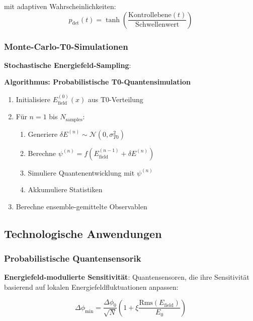\documentclass[12pt,a4paper]{article}
\newcommand{\xipar}{\xi}
\theoremstyle{definition}
\theoremstyle{remark}
\begin{document}
mit adaptiven Wahrscheinlichkeiten:
\begin{equation}
	p_{\text{det}}(t) = \tanh\left(\frac{\text{Kontrollebene}(t)}{\text{Schwellenwert}}\right)
	\label{eq:adaptive_probabilities}
\end{equation}

\subsubsection{Monte-Carlo-T0-Simulationen}

\textbf{Stochastische Energiefeld-Sampling}:

\textbf{Algorithmus: Probabilistische T0-Quantensimulation}
\begin{enumerate}
	\item Initialisiere $E_{\text{field}}^{(0)}(x)$ aus T0-Verteilung
	\item Für $n = 1$ bis $N_{\text{samples}}$:
	\begin{enumerate}
		\item Generiere $\delta E^{(n)} \sim \mathcal{N}(0, \sigma_{T0}^2)$
		\item Berechne $\psi^{(n)} = f(E_{\text{field}}^{(n-1)} + \delta E^{(n)})$
		\item Simuliere Quantenentwicklung mit $\psi^{(n)}$
		\item Akkumuliere Statistiken
	\end{enumerate}
	\item Berechne ensemble-gemittelte Observablen
\end{enumerate}

\subsection{Technologische Anwendungen}

\subsubsection{Probabilistische Quantensensorik}

\textbf{Energiefeld-modulierte Sensitivität}:
Quantensensoren, die ihre Sensitivität basierend auf lokalen Energiefeldfluktuationen anpassen:

\begin{equation}
	\Delta \phi_{\text{min}} = \frac{\Delta \phi_0}{\sqrt{N}} \left(1 + \xipar \frac{\text{Rms}(E_{\text{field}})}{E_0}\right)
	\label{eq:adaptive_sensitivity}
\end{equation}
\end{document}
